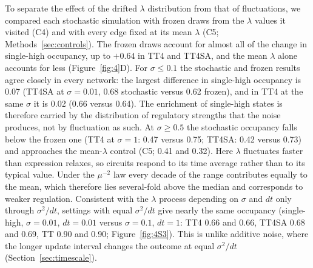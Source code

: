 \documentclass[11pt]{article}
\begin{document}
To separate the effect of the drifted $\lambda$ distribution from that of fluctuations, we compared each stochastic simulation with frozen draws from the $\lambda$ values it visited (C4) and with every edge fixed at its mean $\lambda$ (C5; Methods~\ref{sec:controls}). The frozen draws account for almost all of the change in single-high occupancy, up to $+0.64$ in TT4 and TT4SA, and the mean $\lambda$ alone accounts for less (Figure~\ref{fig:4}D). For $\sigma \leq 0.1$ the stochastic and frozen results agree closely in every network: the largest difference in single-high occupancy is 0.07 (TT4SA at $\sigma = 0.01$, 0.68 stochastic versus 0.62 frozen), and in TT4 at the same $\sigma$ it is 0.02 (0.66 versus 0.64). The enrichment of single-high states is therefore carried by the distribution of regulatory strengths that the noise produces, not by fluctuation as such. At $\sigma \geq 0.5$ the stochastic occupancy falls below the frozen one (TT4 at $\sigma = 1$: 0.47 versus 0.75; TT4SA: 0.42 versus 0.73) and approaches the mean-$\lambda$ control (C5; 0.41 and 0.32). Here $\lambda$ fluctuates faster than expression relaxes, so circuits respond to its time average rather than to its typical value. Under the $\mu^{-2}$ law every decade of the range contributes equally to the mean, which therefore lies several-fold above the median and corresponds to weaker regulation. Consistent with the $\lambda$ process depending on $\sigma$ and $dt$ only through $\sigma^2/dt$, settings with equal $\sigma^2/dt$ give nearly the same occupancy (single-high, $\sigma = 0.01$, $dt = 0.01$ versus $\sigma = 0.1$, $dt = 1$: TT4 0.66 and 0.66, TT4SA 0.68 and 0.69, TT 0.90 and 0.90; Figure~\ref{fig:4S3}). This is unlike additive noise, where the longer update interval changes the outcome at equal $\sigma^2/dt$ (Section~\ref{sec:timescale}).
\end{document}
